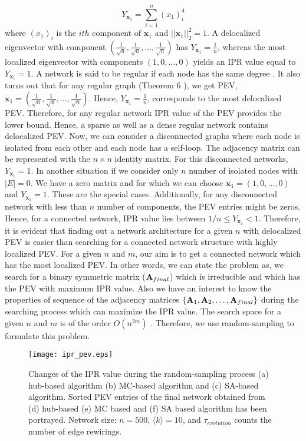\documentclass[envcountreset,oribibl]{llncs}
\begin{document}
\begin{equation} \label{eq_IPR}
Y_{\bm{x}_{1}}=\sum_{i=1}^n (x_{1})_{i}^4 
\end{equation}
where $(x_{1})_{i}$ is the $ith$ component of $\bm{x}_1$ and $||\bm{x}_1||_2^2=1$. A delocalized eigenvector with component $(\frac{1}{\sqrt{n}},\frac{1}{\sqrt{n}},\ldots,\frac{1}{\sqrt{n}})$ has $Y_{ \bm{x}_1}=\frac{1}{n}$, whereas the most localized eigenvector with components $(1,0,\ldots,0)$ yields an IPR value equal to $Y_{\bm{x}_1} = 1$. A network is said to be regular if each node has the same degree \cite{miegham_book2011}. It also turns out that for any regular graph (Theorem 6 \cite{miegham_book2011}), we get PEV, $\bm{ x}_1=(\frac{1}{\sqrt{n}},\frac{1}{\sqrt{n}},\ldots,\frac{1}{\sqrt{n}})$. Hence, $Y_{\bm{ x}_1}=\frac{1}{n}$, corresponds to the most delocalized PEV. Therefore, for any regular network IPR value of the PEV provides the lower bound. Hence, a sparse as well as a dense regular network contains delocalized PEV. Now, we can consider a disconnected graphs where each node is isolated from each other and each node has a self-loop. The adjacency matrix can be represented with the $n \times n$ identity matrix. For this disconnected networks, $Y_{\bm{ x}_1} = 1$. In another situation if we consider only $n$ number of isolated nodes with $|E|=0$. We have a zero matrix and for which we can choose $\bm{ x}_1=(1,0,\ldots,0)$ and $Y_{\bm {x}_1} = 1$. These are the special cases. Additionally, for any disconnected network with less than $n$ number of components, the PEV entries might be zeros. Hence, for a connected network, IPR value lies between $ 1/n \leq Y_{\bm{ x}_{1}}<1$. Therefore, it is evident that finding out a network architecture for a given $n$ with delocalized PEV is easier than searching for a connected network structure with highly localized PEV. For a given $n$ and $m$, our aim is to get a connected network
which has the most localized PEV. In other words, we can state the problem as, we search for a binary symmetric matrix (${\bf A}_{final}$) which is irreducible and which has the PEV with maximum IPR value. Also we have an interest to know the properties of sequence of the adjacency matrices $\{{\bf A}_1, {\bf A}_2, \ldots, {\bf A}_{final} \}$ during the searching process which can maximize the IPR value. The search space for a given $n$ and $m$ is of the order $O(n^{2m})$ \cite{search_space}. Therefore, we use random-sampling to formulate this problem.
\begin{figure}[t]
\begin{center}
\texttt{[image: ipr\_pev.eps]}
\caption{Changes of the IPR value during the random-sampling process (a) hub-based algorithm (b) MC-based algorithm and (c) SA-based algorithm. Sorted PEV entries of the final network obtained from (d) hub-based (e) MC based and (f) SA based algorithm has been portrayed. Network size: $n=500$, $\langle k \rangle =10$, and $\tau_{evolution}$ counts the number of edge rewirings.}
\label{opt_ipr}
\end{center}
\end{figure}
\end{document}
